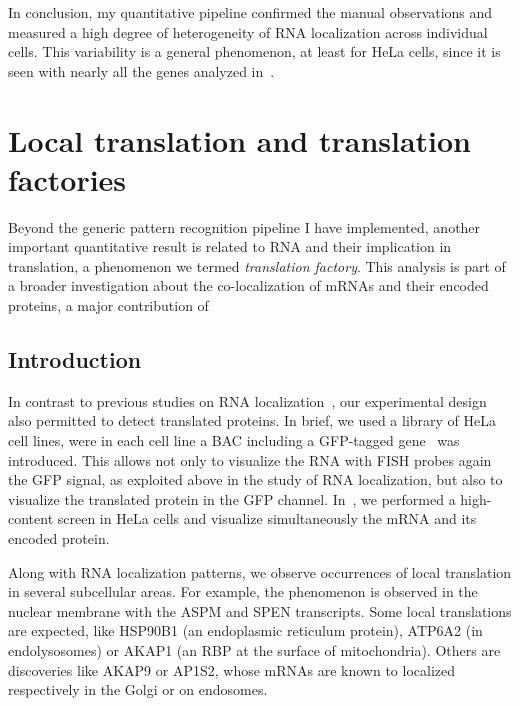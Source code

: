 In conclusion, my quantitative pipeline confirmed the manual observations and measured a high degree of heterogeneity of \ac{RNA} localization across individual cells.
This variability is a general phenomenon, at least for HeLa cells, since it is seen with nearly all the genes analyzed in~\cite{CHOUAIB_2020}.

\section{Local translation and translation factories}
\label{sec:translation_factories}

Beyond the generic pattern recognition pipeline I have implemented, another important quantitative result is related to \ac{RNA} and their implication in translation, a phenomenon we termed \emph{translation factory}.
This analysis is part of a broader investigation about the co-localization of \ac{mRNA}s and their encoded proteins, a major contribution of~\cite{CHOUAIB_2020}

\subsection{Introduction}
\label{subsec:introduction_translation_factories}

In contrast to previous studies on \ac{RNA} localization~\cite{lecuyer_global_2007, battich_image-based_2013, Chen_2015, eng_seqfish_2019, Xia_2019}, our experimental design also permitted to detect translated proteins.
In brief, we used a library of HeLa cell lines, were in each cell line a \ac{BAC} including a \ac{GFP}-tagged gene~\cite{poser_bac_2008} was introduced.
This allows not only to visualize the RNA with FISH probes again the GFP signal, as exploited above in the study of RNA localization, but also to visualize the translated protein in the GFP channel.
In~\cite{CHOUAIB_2020}, we performed a high-content screen in HeLa cells and visualize simultaneously the \ac{mRNA} and its encoded protein.

Along with \ac{RNA} localization patterns, we observe occurrences of local translation in several subcellular areas.
For example, the phenomenon is observed in the nuclear membrane with the ASPM and SPEN transcripts.
Some local translations are expected, like HSP90B1 (an endoplasmic reticulum protein), ATP6A2 (in endolysosomes) or AKAP1 (an \ac{RBP} at the surface of mitochondria).
Others are discoveries like AKAP9 or AP1S2, whose \ac{mRNA}s are known to localized respectively in the Golgi or on endosomes.

